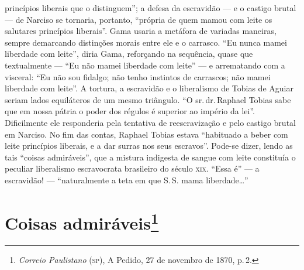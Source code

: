 \begin{argumento}
{princípios liberais que o distinguem''; a defesa da escravidão --- e o
castigo brutal --- de Narciso se tornaria, portanto, ``própria de quem
mamou com leite os salutares princípios liberais''. Gama usaria a
metáfora de variadas maneiras, sempre demarcando distinções morais entre
ele e o carrasco. ``Eu nunca mamei liberdade com leite'', diria Gama,
reforçando na sequência, quase que textualmente --- ``Eu não mamei
liberdade com leite'' --- e arrematando com a visceral: ``Eu não sou
fidalgo; não tenho instintos de carrascos; não mamei liberdade com
leite''. A tortura, a escravidão e o liberalismo de Tobias de Aguiar
seriam lados equiláteros de um mesmo triângulo. ``O sr.\,dr.\,Raphael
Tobias sabe que em nossa pátria o poder dos régulos é superior ao
império da lei''. Dificilmente ele responderia pela tentativa de
reescravização e pelo castigo brutal em Narciso. No fim das contas,
Raphael Tobias estava ``habituado a beber com leite princípios liberais,
e a dar surras nos seus escravos''. Pode-se dizer, lendo as tais ``coisas
admiráveis'', que a mistura indigesta de sangue com leite constituía o
peculiar liberalismo escravocrata brasileiro do século \textsc{xix}. ``Essa é'' ---
a escravidão! --- ``naturalmente a teta em que S.\,S. mama liberdade\ldots{}''}
\end{argumento}

\chapter{Coisas admiráveis\footnote{\emph{Correio Paulistano} (\textsc{sp}), A Pedido, 27 de novembro de 1870,
  p.\,2.}} %

